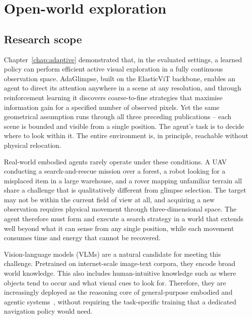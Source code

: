 \chapter{Open-world exploration}
\label{chap:openworld}

\section{Research scope}
\label{sec:openworld-scope}

Chapter~\ref{chap:adaptive} demonstrated that, in the evaluated settings, a learned policy can perform efficient active visual exploration in a fully continuous observation space. AdaGlimpse, built on the ElasticViT backbone, enables an agent to direct its attention anywhere in a scene at any resolution, and through reinforcement learning it discovers coarse-to-fine strategies that maximise information gain for a specified number of observed pixels. Yet the same geometrical assumption runs through all three preceding publications -- each scene is bounded and visible from a single position. The agent's task is to decide where to look within it. The entire environment is, in principle, reachable without physical relocation.

Real-world embodied agents rarely operate under these conditions. A UAV conducting a search-and-rescue mission over a forest, a robot looking for a misplaced item in a large warehouse, and a rover mapping unfamiliar terrain all share a challenge that is qualitatively different from glimpse selection. The target may not be within the current field of view at all, and acquiring a new observation requires physical movement through three-dimensional space. The agent therefore must form and execute a search strategy in a world that extends well beyond what it can sense from any single position, while each movement consumes time and energy that cannot be recovered.

Vision-language models (VLMs) are a natural candidate for meeting this challenge. Pretrained on internet-scale image-text corpora, they encode broad world knowledge. This also includes human-intuitive knowledge such as where objects tend to occur and what visual cues to look for. Therefore, they are increasingly deployed as the reasoning core of general-purpose embodied and agentic systems~\cite{black2024pi_0,google2024pivot}, without requiring the task-specific training that a dedicated navigation policy would need.

